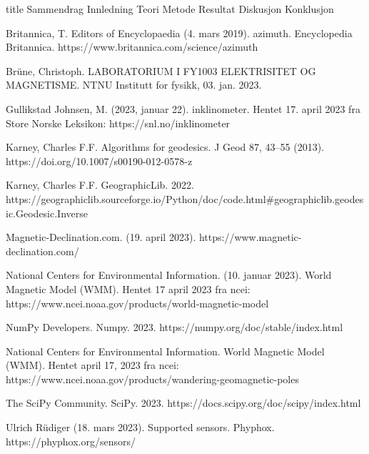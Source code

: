 \documentclass[5p]{article}
\begin{document}
{title} %
{Sammendrag}
\pagebreak
{Innledning}
{Teori}
\pagebreak
{Metode}
{Resultat}
\pagebreak
{Diskusjon}
{Konklusjon}

\begin{thebibliography}{5}
 Britannica, T. Editors of Encyclopaedia (4. mars 2019). azimuth. Encyclopedia Britannica. https://www.britannica.com/science/azimuth

Brüne, Christoph. LABORATORIUM I FY1003 ELEKTRISITET OG MAGNETISME. NTNU Institutt for fysikk, 03. jan. 2023.

Gullikstad Johnsen, M. (2023, januar 22). inklinometer. Hentet 17. april 2023 fra Store Norske Leksikon: https://snl.no/inklinometer

 Karney, Charles F.F. Algorithms for geodesics. J Geod 87, 43–55 (2013). https://doi.org/10.1007/s00190-012-0578-z

 Karney, Charles F.F. GeographicLib. 2022. \\
https://geographiclib.sourceforge.io/Python/doc/code.html\#geographiclib.geodesic.Geodesic.Inverse

 Magnetic-Declination.com. (19. april 2023). https://www.magnetic-declination.com/

National Centers for Environmental Information. (10. januar 2023). World Magnetic Model (WMM). Hentet 17 april 2023 fra ncei: https://www.ncei.noaa.gov/products/world-magnetic-model

 NumPy Developers. Numpy. 2023. https://numpy.org/doc/stable/index.html

National Centers for Environmental Information. World Magnetic Model (WMM). Hentet april 17, 
2023 fra ncei: https://www.ncei.noaa.gov/products/wandering-geomagnetic-poles

 The SciPy Community. SciPy. 2023. 
https://docs.scipy.org/doc/scipy/index.html

 Ulrich Rüdiger (18. mars 2023). Supported sensors. Phyphox. 
https://phyphox.org/sensors/

\end{thebibliography}
\end{document}
